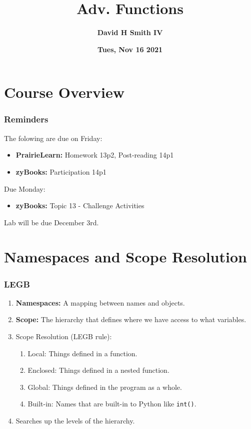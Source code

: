\documentclass{beamer}
\title{\textbf{Adv. Functions}}
\author{\textbf{David H Smith IV}}
\institute[\textbf{UIUC}]{\textbf{University of Illinois Urbana-Champaign}}
\date{\textbf{Tues, Nov 16 2021}}
\begin{document}
\frame{\titlepage}

\section{Course Overview}

%
%
\begin{frame}
  \frametitle{Reminders}
  The folowing are due on Friday:
  \begin{itemize}
    \item \textbf{PrairieLearn:} Homework 13p2, Post-reading 14p1
    \item \textbf{zyBooks:} Participation 14p1
  \end{itemize}
  \vfill
  Due Monday:
  \begin{itemize}
    \item \textbf{zyBooks:} Topic 13 - Challenge Activities 
  \end{itemize}
  \vfill
  Lab will be due December 3rd.
\end{frame}

\section{Namespaces and Scope Resolution}

%
%
\begin{frame}[fragile]
  \frametitle{LEGB}
  \begin{enumerate}
    \item \textbf{Namespaces: } A mapping between names and objects.
    \pause 
    \item \textbf{Scope: } The hierarchy that defines where we have access to what variables.
    \pause
    \item Scope Resolution (LEGB rule):
      \begin{enumerate}
        \item Local: Things defined in a function.
        \item Enclosed: Things defined in a nested function.
        \item Global: Things defined in the program as a whole.
        \item Built-in: Names that are built-in to Python like \lstinline|int()|.
      \end{enumerate}
    \pause
    \item Searches up the levels of the hierarchy.
  \end{enumerate}
\end{frame}
\end{document}
